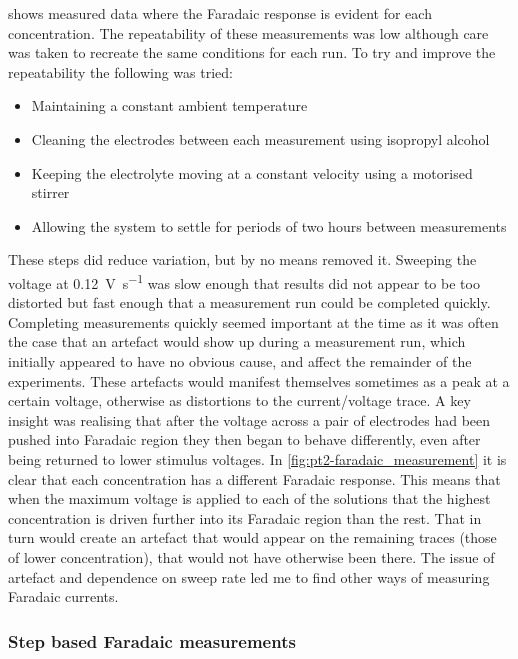        shows measured data where the Faradaic response is evident for each concentration.
      The repeatability of these measurements was low although care was taken to recreate the same conditions for each run.
      To try and improve the repeatability the following was tried:
      \begin{itemize}
        \item Maintaining a constant ambient temperature
        \item Cleaning the electrodes between each measurement using isopropyl alcohol
        \item Keeping the electrolyte moving at a constant velocity using a motorised stirrer
        \item Allowing the system to settle for periods of two hours between measurements
      \end{itemize}
      These steps did reduce variation, but by no means removed it.
      Sweeping the voltage at \SI{0.12}{\volt\per\second} was slow enough that results did not appear to be too distorted but fast enough that a measurement run could be completed quickly.
      Completing measurements quickly seemed important at the time as it was often the case that an artefact would show up during a measurement run, which initially appeared to have no obvious cause, and affect the remainder of the experiments.
      These artefacts would manifest themselves sometimes as a peak at a certain voltage, otherwise as distortions to the current/voltage trace.
      A key insight was realising that after the voltage across a pair of electrodes had been pushed into Faradaic region they then began to behave differently, even after being returned to lower stimulus voltages.
      In \cref{fig:pt2-faradaic_measurement} it is clear that each concentration has a different Faradaic response.
      This means that when the maximum voltage is applied to each of the solutions that the highest concentration is driven further into its Faradaic region than the rest.
      That in turn would create an artefact that would appear on the remaining traces (those of lower concentration), that would not have otherwise been there.
      The issue of artefact and dependence on sweep rate led me to find other ways of measuring Faradaic currents.


      \subsubsection*{Step based Faradaic measurements}


